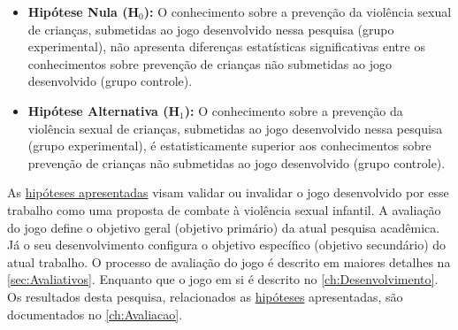 \label{hipotese}
\begin{itemize}

	\item \textbf{Hipótese Nula (H$_{0}$):} O conhecimento sobre a prevenção da violência sexual de crianças, submetidas ao jogo desenvolvido nessa pesquisa (grupo experimental), não apresenta diferenças estatísticas significativas entre os conhecimentos sobre prevenção de crianças não submetidas ao jogo desenvolvido (grupo controle).
	
	\item \textbf{Hipótese Alternativa (H$_{1}$):} O conhecimento sobre a prevenção da violência sexual de crianças, submetidas ao jogo desenvolvido nessa pesquisa (grupo experimental), é estatisticamente superior aos conhecimentos sobre prevenção de crianças não submetidas ao jogo desenvolvido (grupo controle). 
\end{itemize}




As \hyperref[hipotese]{hipóteses apresentadas} visam validar ou invalidar o jogo desenvolvido por esse trabalho como uma proposta de combate à violência sexual infantil. A avaliação do jogo define o objetivo geral (objetivo primário) da atual pesquisa acadêmica. Já o seu desenvolvimento configura o objetivo específico (objetivo secundário) do atual trabalho. O processo de avaliação do jogo é descrito em maiores detalhes na \autoref{sec:Avaliativos}. Enquanto que o jogo em si é descrito no \autoref{ch:Desenvolvimento}. Os resultados desta pesquisa, relacionados as \hyperref[hipotese]{hipóteses} apresentadas, são documentados no \autoref{ch:Avaliacao}.

